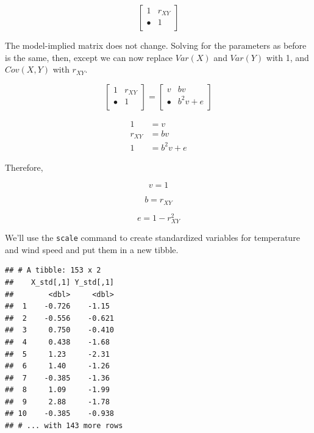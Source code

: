 \documentclass[
]{book}
\newenvironment{Shaded}{\begin{snugshade}}{\end{snugshade}}
\newcommand{\FunctionTok}[1]{\textcolor[rgb]{0.00,0.00,0.00}{#1}}
\newcommand{\NormalTok}[1]{#1}
\newcommand{\OtherTok}[1]{\textcolor[rgb]{0.56,0.35,0.01}{#1}}
\newcommand{\SpecialCharTok}[1]{\textcolor[rgb]{0.00,0.00,0.00}{#1}}
\begin{document}
\[
\begin{bmatrix}
1       &    r_{XY} \\
\bullet &    1      \\
\end{bmatrix}
\]

The model-implied matrix does not change. Solving for the parameters as before is the same, then, except we can now replace \(Var(X)\) and \(Var(Y)\) with 1, and \(Cov(X, Y)\) with \(r_{XY}\).

\[
\begin{bmatrix}
1       &    r_{XY}  \\
\bullet      &    1  \\
\end{bmatrix} =
\begin{bmatrix}
v         &    bv         \\
\bullet   &    b^{2}v + e \\
\end{bmatrix}
\]

\begin{align}
1 &= v \\
r_{XY} &= bv \\
1 &= b^2v + e
\end{align}

Therefore,

\[
v = 1
\]

\[
b = r_{XY}
\]

\[
e = 1 - r_{XY}^{2}
\]

We'll use the \texttt{scale} command to create standardized variables for temperature and wind speed and put them in a new tibble.

\begin{Shaded}
\end{Shaded}

\begin{verbatim}
## # A tibble: 153 x 2
##    X_std[,1] Y_std[,1]
##        <dbl>     <dbl>
##  1    -0.726    -1.15 
##  2    -0.556    -0.621
##  3     0.750    -0.410
##  4     0.438    -1.68 
##  5     1.23     -2.31 
##  6     1.40     -1.26 
##  7    -0.385    -1.36 
##  8     1.09     -1.99 
##  9     2.88     -1.78 
## 10    -0.385    -0.938
## # ... with 143 more rows
\end{verbatim}
\end{document}
